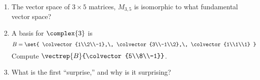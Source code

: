 \begin{enumerate}
%
\item The vector space of $3\times 5$ matrices, $M_{3,5}$ is isomorphic to what fundamental vector space?
%
\item A basis for $\complex{3}$ is
%
\begin{equation*}
B=\set{
\colvector{1\\2\\-1},\,
\colvector{3\\-1\\2},\,
\colvector{1\\1\\1}
}
\end{equation*}
%
Compute $\vectrep{B}{\colvector{5\\8\\-1}}$.
%
\item What is the first ``surprise,'' and why is it surprising?
%
\end{enumerate}